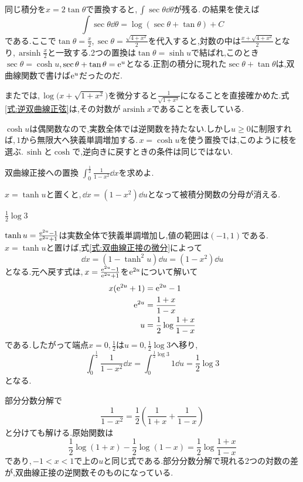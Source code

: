 同じ積分を$x=2\tan\theta$で置換すると,\,$\int\sec\theta\dd\theta$が残る.\,の結果を使えば
\[
\int\sec\theta\dd\theta=\log(\sec\theta+\tan\theta)+C
\]
である.ここで$\tan\theta=\frac x2$,\,$\sec\theta=\frac{\sqrt{4+x^2}}2$を代入すると,対数の中は$\frac{x+\sqrt{4+x^2}}2$となり,\,$\operatorname{arsinh}\frac x2$と一致する.2つの置換は$\tan\theta=\sinh u$で結ばれ,このとき$\sec\theta=\cosh u$,\,$\sec\theta+\tan\theta=\mathrm{e}^u$となる.正割の積分に現れた$\sec\theta+\tan\theta$は,双曲線関数で書けば$\mathrm{e}^u$だったのだ.

またでは,\,$\log\bigl(x+\sqrt{1+x^2}\bigr)$を微分すると$\frac1{\sqrt{1+x^2}}$になることを直接確かめた.式\eqref{式:逆双曲線正弦}は,その対数が$\operatorname{arsinh}x$であることを表している.

$\cosh u$は偶関数なので,実数全体では逆関数を持たない.しかし$u\ge0$に制限すれば,\,$1$から無限大へ狭義単調増加する.\,$x=\cosh u$を使う置換では,このように枝を選ぶ.\,$\sinh$と$\cosh$で,逆向きに戻すときの条件は同じではない.

\begin{example}{双曲線正接への置換}
$\int_0^{\frac12}\frac1{1-x^2}\dd x$を求めよ.
\end{example}

$x=\tanh u$と置くと,\,$\dd x=(1-x^2)\dd u$となって被積分関数の分母が消える.

$\frac12\log3$

$\tanh u=\frac{\mathrm{e}^{2u}-1}{\mathrm{e}^{2u}+1}$は実数全体で狭義単調増加し,値の範囲は$(-1,1)$である.\,$x=\tanh u$と置けば,式\eqref{式:双曲線正接の微分}によって
\[
\dd x=(1-\tanh^2u)\dd u=(1-x^2)\dd u
\]
となる.元へ戻す式は,\,$x=\frac{\mathrm{e}^{2u}-1}{\mathrm{e}^{2u}+1}$を$\mathrm{e}^{2u}$について解いて
\begin{align*}
x(\mathrm{e}^{2u}+1)&=\mathrm{e}^{2u}-1\\
\mathrm{e}^{2u}&=\frac{1+x}{1-x}\\
u&=\frac12\log\frac{1+x}{1-x}
\end{align*}
である.したがって端点$x=0,\frac12$は$u=0,\frac12\log3$へ移り,
\[
\int_0^{\frac12}\frac1{1-x^2}\dd x
=\int_0^{\frac12\log3}1\dd u
=\frac12\log3
\]
となる.

部分分数分解で
\[
\frac1{1-x^2}=\frac12\left(\frac1{1+x}+\frac1{1-x}\right)
\]
と分けても解ける.原始関数は
\[
\frac12\log(1+x)-\frac12\log(1-x)
=\frac12\log\frac{1+x}{1-x}
\]
であり,\,$-1<x<1$で上の$u$と同じ式である.部分分数分解で現れる2つの対数の差が,双曲線正接の逆関数そのものになっている.
